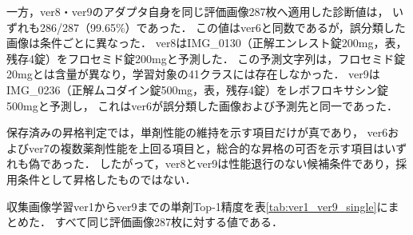 \documentclass[uplatex,dvipdfmx]{jsarticle}
\begin{document}
一方，ver8・ver9のアダプタ自身を同じ評価画像287枚へ適用した診断値は，
いずれも286/287（99.65\%）であった．
この値はver6と同数であるが，誤分類した画像は条件ごとに異なった．
ver8はIMG\_0130（正解エンレスト錠200mg，表，残存4錠）をフロセミド錠200mgと予測した．
この予測文字列は，フロセミド錠20mgとは含量が異なり，学習対象の41クラスには存在しなかった．
ver9はIMG\_0236（正解ムコダイン錠500mg，表，残存4錠）をレボフロキサシン錠500mgと予測し，
これはver6が誤分類した画像および予測先と同一であった．

保存済みの昇格判定では，単剤性能の維持を示す項目だけが真であり，
ver6およびver7の複数薬剤性能を上回る項目と，総合的な昇格の可否を示す項目はいずれも偽であった．
したがって，ver8とver9は性能退行のない候補条件であり，採用条件として昇格したものではない．

収集画像学習ver1からver9までの単剤Top-1精度を表\ref{tab:ver1_ver9_single}にまとめた．
すべて同じ評価画像287枚に対する値である．
\end{document}
